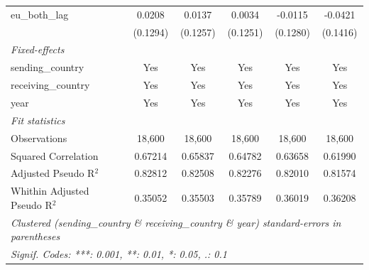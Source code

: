 \begin{tabular}{lccccc}
   eu\_both\_lag                 & 0.0208         & 0.0137         & 0.0034         & -0.0115        & -0.0421\\   
                                 & (0.1294)       & (0.1257)       & (0.1251)       & (0.1280)       & (0.1416)\\   
   \midrule
   \emph{Fixed-effects}\\
   sending\_country              & Yes            & Yes            & Yes            & Yes            & Yes\\  
   receiving\_country            & Yes            & Yes            & Yes            & Yes            & Yes\\  
   year                          & Yes            & Yes            & Yes            & Yes            & Yes\\  
   \midrule
   \emph{Fit statistics}\\
   Observations                  & 18,600         & 18,600         & 18,600         & 18,600         & 18,600\\  
   Squared Correlation           & 0.67214        & 0.65837        & 0.64782        & 0.63658        & 0.61990\\  
   Adjusted Pseudo R$^2$         & 0.82812        & 0.82508        & 0.82276        & 0.82010        & 0.81574\\  
   Whithin Adjusted Pseudo R$^2$ & 0.35052        & 0.35503        & 0.35789        & 0.36019        & 0.36208\\  
   \midrule \midrule
   \multicolumn{6}{l}{\emph{Clustered (sending\_country \& receiving\_country \& year) standard-errors in parentheses}}\\
   \multicolumn{6}{l}{\emph{Signif. Codes: ***: 0.001, **: 0.01, *: 0.05, .: 0.1}}\\
\end{tabular}
\par\endgroup


